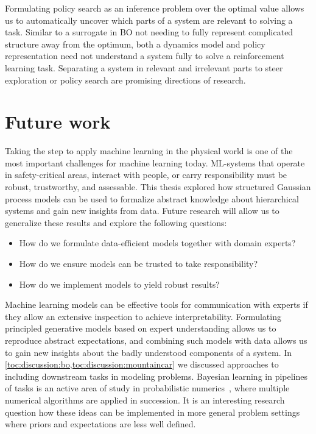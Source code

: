 Formulating policy search as an inference problem over the optimal value allows us to automatically uncover which parts of a system are relevant to solving a task.
Similar to a surrogate in BO not needing to fully represent complicated structure away from the optimum, both a dynamics model and policy representation need not understand a system fully to solve a reinforcement learning task.
Separating a system in relevant and irrelevant parts to steer exploration or policy search are promising directions of research.


\section{Future work}
\label{toc:discussion:future_work}
Taking the step to apply machine learning in the physical world is one of the most important challenges for machine learning today.
ML-systems that operate in safety-critical areas, interact with people, or carry responsibility must be robust, trustworthy, and assessable.
This thesis explored how structured Gaussian process models can be used to formalize abstract knowledge about hierarchical systems and gain new insights from data.
Future research will allow us to generalize these results and explore the following questions:
\begin{itemize}
    \item How do we formulate data-efficient models together with domain experts?
    \item How do we ensure models can be trusted to take responsibility?
    \item How do we implement models to yield robust results?
\end{itemize}

Machine learning models can be effective tools for communication with experts if they allow an extensive inspection to achieve interpretability.
Formulating principled generative models based on expert understanding allows us to reproduce abstract expectations, and combining such models with data allows us to gain new insights about the badly understood components of a system.
In \cref{toc:discussion:bo,toc:discussion:mountaincar} we discussed approaches to including downstream tasks in modeling problems.
Bayesian learning in pipelines of tasks is an active area of study in probabilistic numerics~\parencite{cockayne_bayesian_2019}, where multiple numerical algorithms are applied in succession.
It is an interesting research question how these ideas can be implemented in more general problem settings where priors and expectations are less well defined.


